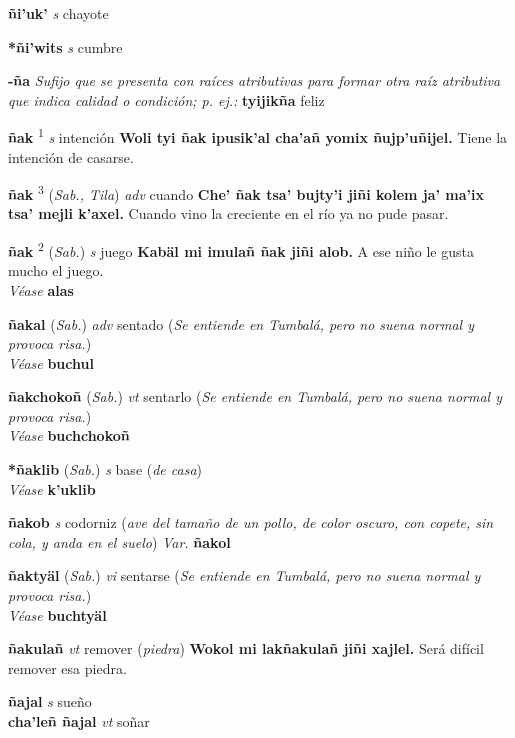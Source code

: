 \documentclass[10pt]{scrbook}
\newcommand{\entry}[1]{\textbf{#1}}
\newcommand{\alphaletter}[1]{\end{multicols}\addsec{#1}\begin{multicols}{2}}
\newcommand{\defsuperscript}[1]{\textsuperscript{#1}}
\newcommand{\nontranslationdef}[1]{\textit{#1}}
\newcommand{\partofspeech}[1]{\textit{#1}}
\newcommand{\spanishtranslation}[1]{#1}
\newcommand{\clarification}[1]{(\textit{#1})}
\newcommand{\cholexample}[1]{\textbf{#1}}
\newcommand{\exampletranslation}[1]{#1}
\newcommand{\alsosee}[1]{\\\textit{Véase} \textbf{#1}}
\newcommand{\relevantdialect}[1]{(\textit{#1})}
\newcommand{\secondaryentry}[1]{\\\textbf{#1}}
\newcommand{\secondpartofspeech}[1]{\textit{#1}}
\newcommand{\secondtranslation}[1]{#1}
\newcommand{\variation}[1]{\textit{Var.} \textbf{#1}}
\begin{document}
\begin{multicols}{2}
\entry{ñi'uk'}
\partofspeech{s}
\spanishtranslation{chayote}

\entry{*ñi'wits}
\partofspeech{s}
\spanishtranslation{cumbre}

\alphaletter{Ñ}

\entry{-ña}
\nontranslationdef{Sufijo que se presenta con raíces atributivas para formar otra raíz atributiva que indica calidad o condición; p. ej.:}
\cholexample{tyijikña}
\exampletranslation{feliz}

\entry{ñak}
\defsuperscript{1}
\partofspeech{s}
\spanishtranslation{intención}
\cholexample{Woli tyi ñak ipusik'al cha'añ yomix ñujp'uñijel.}
\exampletranslation{Tiene la intención de casarse.}

\entry{ñak}
\defsuperscript{3}
\relevantdialect{Sab., Tila}
\partofspeech{adv}
\spanishtranslation{cuando}
\cholexample{Che' ñak tsa' bujty'i jiñi kolem ja' ma'ix tsa' mejli k'axel.}
\exampletranslation{Cuando vino la creciente en el río ya no pude pasar.}

\entry{ñak}
\defsuperscript{2}
\relevantdialect{Sab.}
\partofspeech{s}
\spanishtranslation{juego}
\cholexample{Kabäl mi imulañ ñak jiñi alob.}
\exampletranslation{A ese niño le gusta mucho el juego.}
\alsosee{alas}

\entry{ñakal}
\relevantdialect{Sab.}
\partofspeech{adv}
\spanishtranslation{sentado}
\clarification{Se entiende en Tumbalá, pero no suena normal y provoca risa.}
\alsosee{buchul}

\entry{ñakchokoñ}
\relevantdialect{Sab.}
\partofspeech{vt}
\spanishtranslation{sentarlo}
\clarification{Se entiende en Tumbalá, pero no suena normal y provoca risa.}
\alsosee{buchchokoñ}

\entry{*ñaklib}
\relevantdialect{Sab.}
\partofspeech{s}
\spanishtranslation{base}
\clarification{de casa}
\alsosee{k'uklib}

\entry{ñakob}
\partofspeech{s}
\spanishtranslation{codorniz}
\clarification{ave del tamaño de un pollo, de color oscuro, con copete, sin cola, y anda en el suelo}
\variation{ñakol}

\entry{ñaktyäl}
\relevantdialect{Sab.}
\partofspeech{vi}
\spanishtranslation{sentarse}
\clarification{Se entiende en Tumbalá, pero no suena normal y provoca risa.}
\alsosee{buchtyäl}

\entry{ñakulañ}
\partofspeech{vt}
\spanishtranslation{remover}
\clarification{piedra}
\cholexample{Wokol mi lakñakulañ jiñi xajlel.}
\exampletranslation{Será difícil remover esa piedra.}

\entry{ñajal}
\partofspeech{s}
\spanishtranslation{sueño}
\secondaryentry{cha'leñ ñajal}
\secondpartofspeech{vt}
\secondtranslation{soñar}


\end{multicols}
\end{document}
